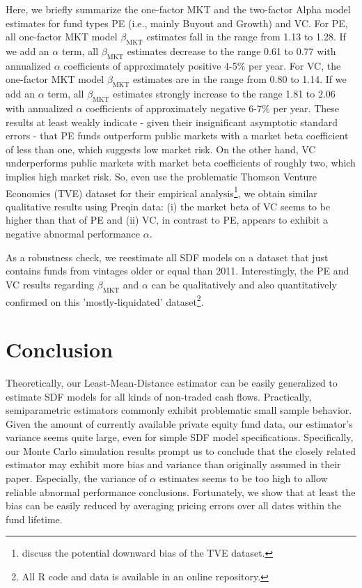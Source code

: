 \documentclass[12pt]{article}
\begin{document}
Here, we briefly summarize the one-factor MKT and the two-factor Alpha model estimates for fund types PE (i.e., mainly Buyout and Growth) and VC.
For PE, all one-factor MKT model $\beta_{\mathrm{MKT}}$ estimates fall in the range from 1.13 to 1.28. 
If we add an $\alpha$ term, all $\beta_{\mathrm{MKT}}$ estimates decrease to the range 0.61 to 0.77 with annualized $\alpha$ coefficients of approximately positive 4-5\% per year.
For VC, the one-factor MKT model $\beta_{\mathrm{MKT}}$ estimates are in the range from 0.80 to 1.14.
If we add an $\alpha$ term, all $\beta_{\mathrm{MKT}}$ estimates strongly increase to the range 1.81 to 2.06 with annualized $\alpha$ coefficients of approximately negative 6-7\% per year.
These results at least weakly indicate - given their insignificant asymptotic standard errors - that PE funds outperform public markets with a market beta coefficient of less than one, which suggests low market risk.
On the other hand, VC underperforms public markets with market beta coefficients of roughly two, which implies high market risk.
So, even \cite{DLP12} use the problematic Thomson Venture Economics (TVE) dataset for their empirical analysis\footnote{\cite{HJK14} discuss the potential downward bias of the TVE dataset.}, we obtain similar qualitative results using Preqin data: (i) the market beta of VC seems to be higher than that of PE and (ii) VC, in contrast to PE, appears to exhibit a negative abnormal performance $\alpha$.

As a robustness check, we reestimate all SDF models on a dataset that just contains funds from vintages older or equal than 2011.
Interestingly, the PE and VC results regarding $\beta_{\mathrm{MKT}}$ and $\alpha$ can be qualitatively and also quantitatively confirmed on this 'mostly-liquidated' dataset\footnote{All R code and data is available in an online repository. %
}.




\section{Conclusion}
\label{sec:conclusion}

Theoretically, our Least-Mean-Distance estimator can be easily generalized to estimate SDF models for all kinds of non-traded cash flows.
Practically, semiparametric estimators commonly exhibit problematic small sample behavior.
Given the amount of currently available private equity fund data, our estimator's variance seems quite large, even for simple SDF model specifications.
Specifically, our Monte Carlo simulation results prompt us to conclude that the closely related \cite{DLP12} estimator may exhibit more bias and variance than originally assumed in their paper.
Especially, the variance of $\alpha$ estimates seems to be too high to allow reliable abnormal performance conclusions.
Fortunately, we show that at least the bias can be easily reduced by averaging pricing errors over all dates within the fund lifetime.
\end{document}
